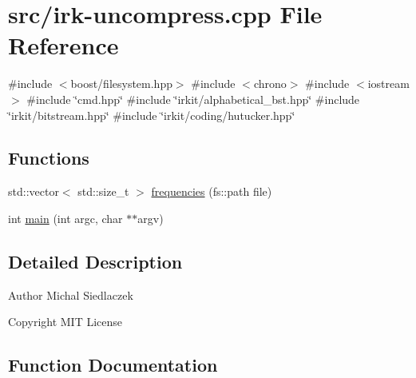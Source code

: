 \hypertarget{irk-uncompress_8cpp}{}\section{src/irk-\/uncompress.cpp File Reference}
\label{irk-uncompress_8cpp}
{\ttfamily \#include $<$boost/filesystem.\+hpp$>$}\newline
{\ttfamily \#include $<$chrono$>$}\newline
{\ttfamily \#include $<$iostream$>$}\newline
{\ttfamily \#include \char`\"{}cmd.\+hpp\char`\"{}}\newline
{\ttfamily \#include \char`\"{}irkit/alphabetical\+\_\+bst.\+hpp\char`\"{}}\newline
{\ttfamily \#include \char`\"{}irkit/bitstream.\+hpp\char`\"{}}\newline
{\ttfamily \#include \char`\"{}irkit/coding/hutucker.\+hpp\char`\"{}}\newline
\subsection*{Functions}
\begin{DoxyCompactItemize}
\item 
std\+::vector$<$ std\+::size\+\_\+t $>$ \mbox{\hyperlink{irk-uncompress_8cpp_a2cd80733ced3d7eda8a6de0389cccc73}{frequencies}} (fs\+::path file)
\item 
int \mbox{\hyperlink{irk-uncompress_8cpp_a3c04138a5bfe5d72780bb7e82a18e627}{main}} (int argc, char $\ast$$\ast$argv)
\end{DoxyCompactItemize}


\subsection{Detailed Description}
\begin{DoxyAuthor}{Author}
Michal Siedlaczek 
\end{DoxyAuthor}
\begin{DoxyCopyright}{Copyright}
M\+IT License 
\end{DoxyCopyright}


\subsection{Function Documentation}
\mbox{\label{irk-uncompress_8cpp_a2cd80733ced3d7eda8a6de0389cccc73}} 
